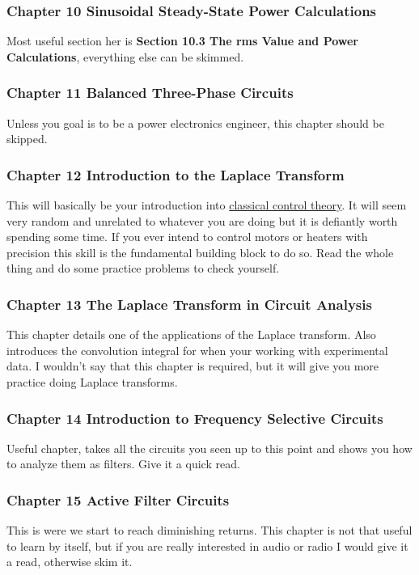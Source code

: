 \documentclass[11pt]{article}
\begin{document}
\subsubsection{Chapter 10 Sinusoidal Steady-State Power Calculations}
\label{sec:org269d4bf}
Most useful section her is \textbf{\textbf{Section 10.3 The rms Value and Power Calculations}}, everything else
can be skimmed.
\subsubsection{Chapter 11 Balanced Three-Phase Circuits}
\label{sec:orgf94f386}
Unless you goal is to be a power electronics engineer, this chapter should be skipped.
\subsubsection{Chapter 12 Introduction to the Laplace Transform}
\label{sec:orgee17a2e}
This will basically be your introduction into \href{https://en.wikipedia.org/wiki/Classical\_control\_theory}{classical control theory}. It will seem very random and
unrelated to whatever you are doing but it is defiantly worth spending some time. If you ever intend
to control motors or heaters with precision this skill is the fundamental building block to do so.
Read the whole thing and do some practice problems to check yourself.
\subsubsection{Chapter 13 The Laplace Transform in Circuit Analysis}
\label{sec:org5d617e0}
This chapter details one of the applications of the Laplace transform. Also introduces the
convolution integral for when your working with experimental data. I wouldn't say that this chapter
is required, but it will give you more practice doing Laplace transforms.
\subsubsection{Chapter 14 Introduction to Frequency Selective Circuits}
\label{sec:org2179e4c}
Useful chapter, takes all the circuits you seen up to this point and shows you how to analyze them
as filters. Give it a quick read.
\subsubsection{Chapter 15 Active Filter Circuits}
\label{sec:org6eb0cc3}
This is were we start to reach diminishing returns. This chapter is not that useful to learn by
itself, but if you are really interested in audio or radio I would give it a read, otherwise skim
it.
\end{document}
